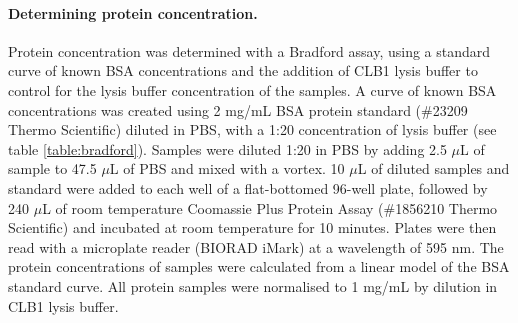 \documentclass[a4paper,11pt,twoside,openright]{scrbook}
\begin{document}
\paragraph{Determining protein concentration.}
Protein concentration was determined with a Bradford assay, using a standard curve of known BSA concentrations and the addition of CLB1 lysis buffer to control for the lysis buffer concentration of the samples.
A curve of known BSA concentrations was created using 2 mg/mL BSA protein standard (\#23209 Thermo Scientific) diluted in PBS, with a 1:20 concentration of lysis buffer (see table \ref{table:bradford}).
Samples were diluted 1:20 in PBS by adding 2.5 $\mu$L of sample to 47.5 $\mu$L of PBS and mixed with a vortex.
10 $\mu$L of diluted samples and standard were added to each well of a flat-bottomed 96-well plate, followed by 240 $\mu$L of room temperature Coomassie Plus Protein Assay (\#1856210 Thermo Scientific) and incubated at room temperature for 10 minutes.
Plates were then read with a microplate reader (BIORAD iMark) at a wavelength of 595 nm.
The protein concentrations of samples were calculated from a linear model of the BSA standard curve.
All protein samples were normalised to 1 mg/mL by dilution in CLB1 lysis buffer.
\end{document}

